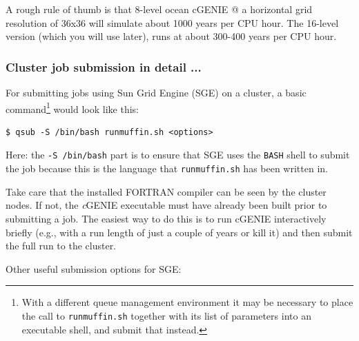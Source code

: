 \documentclass[11pt,fleqn]{book} %
\begin{document}
A rough rule of thumb is that 8-level ocean cGENIE @ a horizontal grid resolution of 36x36 will simulate about 1000 years per CPU hour. The 16-level version (which you will use later), runs at about 300-400 years per CPU hour.


\newpage


\subsubsection{Cluster job submission in detail ...}

\vspace{2mm}

For submitting jobs using Sun Grid Engine (SGE) on a cluster, a basic command\footnote{With a different queue management environment it may be necessary to place the call to \texttt{runmuffin.sh} together with its list of parameters into an executable shell, and submit that instead. } would look like this:
\vspace{-2pt}\begin{verbatim}
$ qsub -S /bin/bash runmuffin.sh <options>
\end{verbatim}\vspace{-2pt}
Here: the \texttt{-S /bin/bash} part is to ensure that SGE uses the \texttt{BASH} shell to submit the job because this is the language that \texttt{runmuffin.sh} has been written in.

Take care that the installed FORTRAN compiler can be seen by the cluster nodes. If not, the \textit{c}GENIE executable must have already been built prior to submitting a job. The easiest way to do this is to run cGENIE interactively briefly (e.g., with a run length of just a couple of years or kill it) and then submit the full run to the cluster.

Other useful submission options for SGE:
\end{document}
